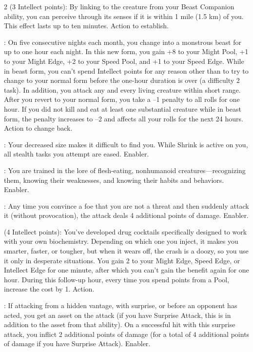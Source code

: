 \begin{multicols}{2}
 (3 Intellect points): By linking to the creature from your Beast Companion ability, you can perceive through its senses if it is within 1 mile (1.5 km) of you. This effect lasts up to ten minutes. Action to establish. 

: On five consecutive nights each month, you change into a monstrous beast for up to one hour each night. In this new form, you gain +8 to your Might Pool, +1 to your Might Edge, +2 to your Speed Pool, and +1 to your Speed Edge. While in beast form, you can’t spend Intellect points for any reason other than to try to change to your normal form before the one-hour duration is over (a difficulty 2 task). In addition, you attack any and every living creature within short range. After you revert to your normal form, you take a –1 penalty to all rolls for one hour. If you did not kill and eat at least one substantial creature while in beast form, the penalty increases to –2 and affects all your rolls for the next 24 hours. Action to change back.

: Your decreased size makes it difficult to find you. While Shrink is active on you, all stealth tasks you attempt are eased. Enabler.

: You are trained in the lore of flesh-eating, nonhumanoid creatures—recognizing them, knowing their weaknesses, and knowing their habits and behaviors. Enabler.

: Any time you convince a foe that you are not a threat and then suddenly attack it (without provocation), the attack deals 4 additional points of damage. Enabler. 

 (4 Intellect points): You’ve developed drug cocktails specifically designed to work with your own biochemistry. Depending on which one you inject, it makes you smarter, faster, or tougher, but when it wears off, the crash is a doozy, so you use it only in desperate situations. You gain 2 to your Might Edge, Speed Edge, or Intellect Edge for one minute, after which you can’t gain the benefit again for one hour. During this follow-up hour, every time you spend points from a Pool, increase the cost by 1. Action. 

: If attacking from a hidden vantage, with surprise, or before an opponent has acted, you get an asset on the attack (if you have Surprise Attack, this is in addition to the asset from that ability). On a successful hit with this surprise attack, you inflict 2 additional points of damage (for a total of 4 additional points of damage if you have Surprise Attack). Enabler.


\end{multicols}
